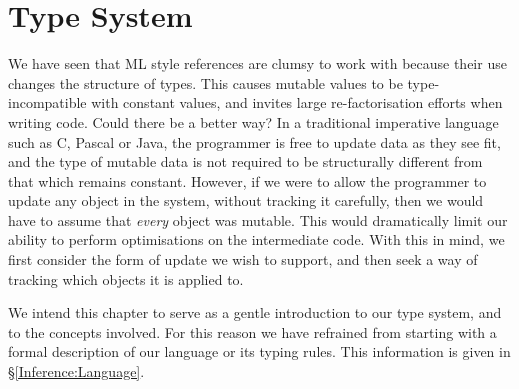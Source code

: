 
\chapter{Type System}

We have seen that ML style references are clumsy to work with because their use changes the structure of types. This causes mutable values to be type-incompatible with constant values, and invites large re-factorisation efforts when writing code. Could there be a better way? In a traditional imperative language such as C, Pascal or Java, the programmer is free to update data as they see fit, and the type of mutable data is not required to be structurally different from that which remains constant. However, if we were to allow the programmer to update any object in the system, without tracking it carefully, then we would have to assume that \emph{every} object was mutable. This would dramatically limit our ability to perform optimisations on the intermediate code. With this in mind, we first consider the form of update we wish to support, and then seek a way of tracking which objects it is applied to.

We intend this chapter to serve as a gentle introduction to our type system, and to the concepts involved. For this reason we have refrained from starting with a formal description of our language or its typing rules. This information is given in \S\ref{Inference:Language}.










